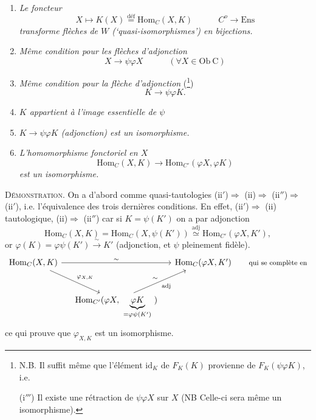 \documentclass[11pt]{article}
\newcommand{\printedpage}[1]{\marginpar{\footnotesize p.~#1}}
\newcommand{\msp}[1]{\marginpar{\footnotesize [#1]}}
\newcommand{\dfeq}{\overset{\text{déf}}{=}}
\begin{document}
\printedpage{23}

\begin{enumerate}
\item[(i)] \textit{Le foncteur}
\[
X\longmapsto K(X)\dfeq\mathrm{Hom}_C(X,K) \qquad\quad C^{o}\longrightarrow\mathrm{Ens}
\]
\textit{transforme flèches de $W$ (‘quasi-isomorphismes’) en bijections.}
\item[(i$'$)] \textit{Même condition pour les flèches d'adjonction}
\[
X\longrightarrow\psi\varphi X \qquad\quad (\forall X\in\mathrm{Ob}\ \mathrm{C})
\]
\item[(i$''$)] \textit{Même condition pour la flèche d'adjonction} (\footnote[6]{N.B. Il suffit même que l'élément $\mathrm{id}_K$ de $F_K(K)$ provienne de $F_K(\psi\varphi K)$, i.e.\par (i$'''$) Il existe une rétraction de $\psi\varphi X$ sur $X$ (NB Celle-ci sera même un isomorphisme).})
\[
K\longrightarrow\psi\varphi K.
\]
\item[(ii)] \textit{$K$ appartient à l'image essentielle de $\psi$}
\item[(ii$'$)] \textit{$K\longrightarrow\psi\varphi K$ (adjonction) est un isomorphisme.}
\item[(ii$''$)] \textit{L'homomorphisme fonctoriel en $X$}
\[
\mathrm{Hom}_C(X,K)\longrightarrow\mathrm{Hom}_{C'}(\varphi X,\varphi K)
\]
\textit{est un isomorphisme.}
\end{enumerate}

\textsc{Démonstration.} On a d'abord comme quasi-tautologies (ii$'$)$\Longrightarrow$ (ii)$\Longrightarrow$ (ii$''$)$\Longrightarrow$ (ii$'$), i.e. l'équivalence des trois dernières conditions. En effet, (ii$'$)$\Longrightarrow$ (ii) tautologique, (ii)$\Longrightarrow$ (ii$''$) car si $K=\psi(K')$ on a %
\msp{page 38}
par adjonction
\[
\mathrm{Hom}_C(X,K)=\mathrm{Hom}_C(X,\psi(K'))\overset{\text{adj}}{\simeq}\mathrm{Hom}_{C'}(\varphi X,K'),
\]
or $\varphi(K)=\varphi\psi(K')\xrightarrow{\ \sim\ }K'$ (adjonction, et $\psi$ pleinement fidèle).
\[
\begin{tikzcd}[column sep=small, row sep=large]
\mathrm{Hom}_C(X,K) \arrow[rr, "\sim"] \arrow[dr, "\varphi_{X,K}"] & & \mathrm{Hom}_C(\varphi X,K') & \text{\footnotesize qui se complète en} \\ %
& \mathrm{Hom}_{C'}(\varphi X,\ \underbrace{\varphi K}_{=\varphi\psi(K')}\ ) \arrow[ur, "\sim", "\text{adj}"'] & &
\end{tikzcd}
\]
ce qui prouve que $\varphi_{X,K}$ est un isomorphisme.
\end{document}
